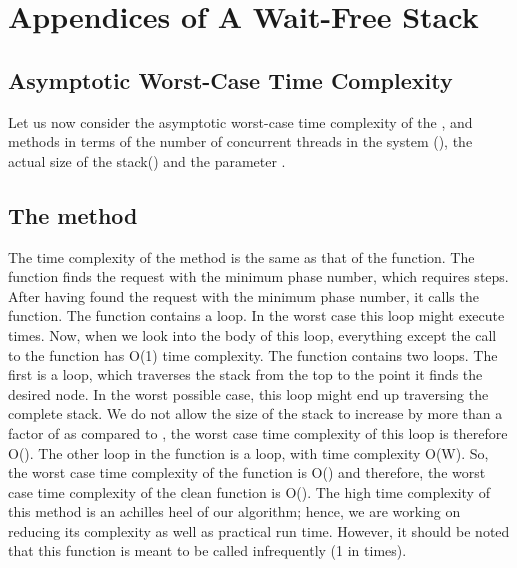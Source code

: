\documentclass{llncs}
\begin{document}
\section* {\textbf{Appendices of A Wait-Free Stack}}
\begin{appendix}

\section{Asymptotic Worst-Case Time Complexity }
Let us now consider the asymptotic worst-case time complexity of the ,  and  methods
in terms of the number of concurrent threads in the system (), the actual size of the
stack() and the parameter . 

\subsection{The  method}
The time complexity of the  method is the same as that of the
 function. The  function finds the  
request with the minimum phase number, which requires  steps. 
After having found the request with the minimum phase number, it calls 
the  function. The  function contains a  
loop. In the worst case this  loop might execute  times. Now, when 
we look into the body of this  loop, everything except the call to 
the  function has O(1) time complexity. The  
function contains two loops. The first is a  loop, which traverses 
the stack from the top to the point it finds the desired node. In the 
worst possible case, this loop might end up traversing the complete stack.
We do not allow the size of the stack to increase by more than 
a factor of  as compared to , the worst case time complexity of this loop is therefore
O(). 
The other loop in the function is a  loop, with time complexity O(W). 
So, the worst case time complexity of the  function is O() 
and therefore, the worst case time complexity of the clean function is O().
The high time complexity of this method is an achilles heel of our algorithm; hence, we
are working on reducing its complexity as well as practical run time.
However, it should be noted that this function is meant to be called infrequently (1 in
 times). 



\end{appendix}
\end{document}
